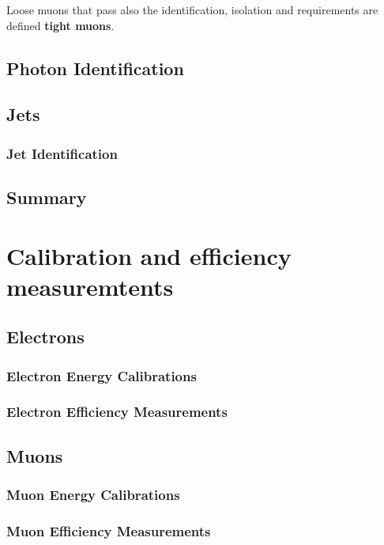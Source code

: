 Loose muons that pass also the identification, isolation and \SIPthreeD requirements are defined \textbf{tight muons}.

\subsection{Photon Identification}
\label{sec:photonID}


\subsection{Jets}
\subsubsection{Jet Identification}


\subsection{Summary}


\section{Calibration and efficiency measuremtents}
\subsection{Electrons}
\subsubsection{Electron Energy Calibrations}

\subsubsection{Electron Efficiency Measurements}
\label{sec:eleEffMeas}


\subsection{Muons}
\subsubsection{Muon Energy Calibrations}

\subsubsection{Muon Efficiency Measurements}
\label{sec:muonEffMeas}

%

